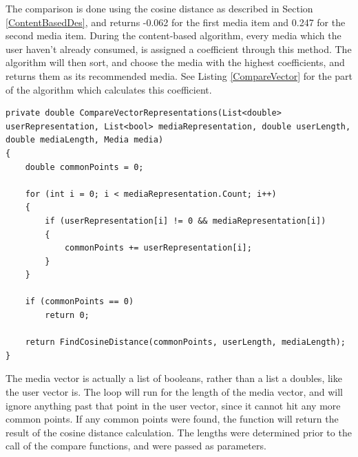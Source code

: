 The comparison is done using the cosine distance as described in Section \ref{ContentBasedDes}, and returns -0.062 for the first media item and 0.247 for the second media item. During the content-based algorithm, every media which the user haven’t already consumed, is assigned a coefficient through this method. The algorithm will then sort, and choose the media with the highest coefficients, and returns them as its recommended media. See Listing \ref{CompareVector} for the part of the algorithm which calculates this coefficient.

\begin{lstlisting}[caption={The CompareVectorRepresentations method of the recommendation algorithm},label={CompareVector}]
private double CompareVectorRepresentations(List<double> userRepresentation, List<bool> mediaRepresentation, double userLength, double mediaLength, Media media)
{
	double commonPoints = 0;

	for (int i = 0; i < mediaRepresentation.Count; i++)
	{
		if (userRepresentation[i] != 0 && mediaRepresentation[i])
		{
			commonPoints += userRepresentation[i];
		}
	}

	if (commonPoints == 0)
		return 0;

	return FindCosineDistance(commonPoints, userLength, mediaLength);
}
\end{lstlisting}

The media vector is actually a list of booleans, rather than a list a doubles, like the user vector is. The loop will run for the length of the media vector, and will ignore anything past that point in the user vector, since it cannot hit any more common points. If any common points were found, the function will return the result of the cosine distance calculation. The lengths were determined prior to the call of the compare functions, and were passed as parameters.